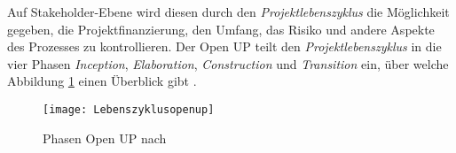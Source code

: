 Auf Stakeholder-Ebene wird diesen durch den \textit{Projektlebenszyklus} die Möglichkeit gegeben, die Projektfinanzierung, den Umfang, das Risiko und andere Aspekte des Prozesses zu kontrollieren.
Der Open UP teilt den \textit{Projektlebenszyklus} in die vier Phasen \textit{Inception}, \textit{Elaboration}, \textit{Construction} und \textit{Transition} ein, über welche Abbildung \ref{fig:Phasen} einen Überblick gibt \cite{eclipseopenup}.

\begin{figure}[htp]
\begin{center}
  \texttt{[image: Lebenszyklusopenup]} %
  \caption{Phasen Open UP nach \cite{eclipseopenup}}
  \label{fig:Phasen}
\end{center}
\end{figure}


